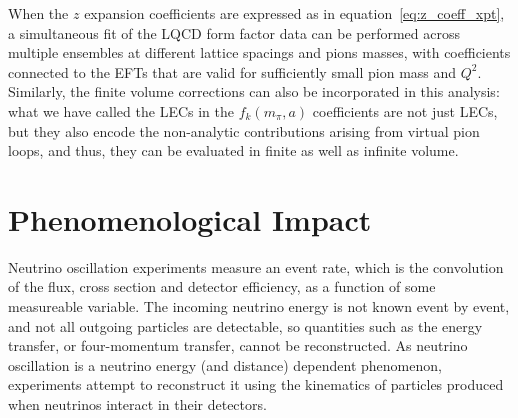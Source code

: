 \documentclass{ar-1col}
\begin{document}
When the $z$ expansion coefficients are expressed as in equation~\eqref{eq:z_coeff_xpt}, a simultaneous fit of the LQCD form factor data can be performed across multiple ensembles at different lattice spacings and pions masses, with coefficients connected to the EFTs that are valid for sufficiently small pion mass and $Q^2$.
Similarly, the finite volume corrections can also be incorporated in this analysis: what we have called the LECs in the $f_k(m_\pi,a)$ coefficients are not just LECs, but they also encode the non-analytic contributions arising from virtual pion loops, and thus, they can be evaluated in finite as well as infinite volume.



\section{Phenomenological Impact\label{sec:impact}}

Neutrino oscillation experiments measure an event rate, which is the convolution of the flux, cross section and detector efficiency, as a function of some measureable variable. The incoming neutrino energy is not known event by event, and not all outgoing particles are detectable, so quantities such as the energy transfer, or four-momentum transfer, cannot be reconstructed. As neutrino oscillation is a neutrino energy (and distance) dependent phenomenon, experiments attempt to reconstruct it using the kinematics of particles produced when neutrinos interact in their detectors.
\end{document}
